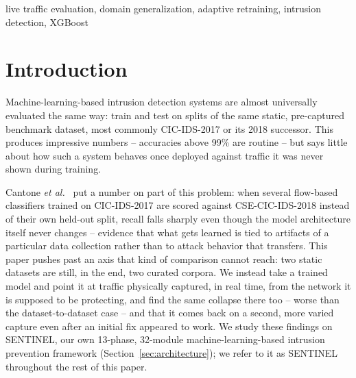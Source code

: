 \documentclass[conference]{IEEEtran}
\begin{document}
\renewcommand{\IEEEkeywordsname}{Keywords}
\begin{IEEEkeywords}
live traffic evaluation, domain generalization, adaptive retraining, intrusion detection, XGBoost
\end{IEEEkeywords}

\section{Introduction}

Machine-learning-based intrusion detection systems are almost universally
evaluated the same way: train and test on splits of the same static,
pre-captured benchmark dataset, most commonly CIC-IDS-2017 or its 2018
successor. This produces impressive numbers -- accuracies above 99\% are
routine -- but says little about how such a system behaves once deployed
against traffic it was never shown during training.

Cantone \textit{et al.}~\cite{cantone2024crossdataset} put a number on part
of this problem: when several flow-based classifiers trained on
CIC-IDS-2017 are scored against CSE-CIC-IDS-2018 instead of their own
held-out split, recall falls sharply even though the model architecture
itself never changes -- evidence that what gets learned is tied to
artifacts of a particular data collection rather than to attack behavior
that transfers. This paper pushes past an axis that kind of comparison
cannot reach: two static datasets are still, in the end, two curated
corpora. We instead take a trained model and point it at traffic
physically captured, in real time, from the network it is supposed to be
protecting, and find the same collapse there too -- worse than the
dataset-to-dataset case -- and that it comes back on a second, more varied
capture even after an initial fix appeared to work. We study these
findings on SENTINEL, our own 13-phase, 32-module machine-learning-based
intrusion prevention framework (Section~\ref{sec:architecture}); we refer
to it as SENTINEL throughout the rest of this paper.
\end{document}

